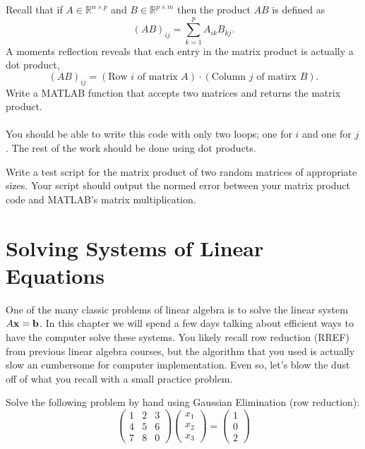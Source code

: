 \begin{problem}
    Recall that if $A \in \mathbb{R}^{n \times p}$ and $B \in \mathbb{R}^{p \times m}$
    then the product $AB$ is defined as
    \[ \left( AB \right)_{ij} = \sum_{k=1}^p A_{ik} B_{kj}. \]
    A moments reflection reveals that each entry in the matrix product is actually a dot
    product, 
    \[ \left( AB \right)_{ij} = \left( \text{Row $i$ of matrix $A$} \right) \cdot \left(
    \text{Column $j$ of matirx $B$} \right). \]
    Write a MATLAB function that accepts two matrices and returns the matrix product. \\
     \\
    You
    should be able to write this code with only two loops; one for $i$ and one for $j$.
    The rest of the work should be done using dot products.
\end{problem}
\begin{problem}
    Write a test script for the matrix product of two random matrices of appropriate sizes.  Your
    script should output the normed error between your matrix product code and MATLAB's
    matrix multiplication.
\end{problem}



\section{Solving Systems of Linear Equations}
One of the many classic problems of linear algebra is to solve the linear system $A {\bf x} =
{\bf b}$. In this chapter we will spend a few days talking about efficient ways to have the computer solve
these systems. You likely recall row reduction (RREF) from previous linear algebra
courses, but the algorithm that you used is actually slow an cumbersome for computer
implementation.  Even so, let's blow the dust off of what you recall with a small practice
problem.

\begin{problem}
    Solve the following problem by hand using Gaussian Elimination (row reduction):
    \[ \begin{pmatrix} 1 & 2 & 3 \\ 4 & 5 & 6 \\ 7 & 8 & 0 \end{pmatrix} \begin{pmatrix}
            x_1 \\ x_2 \\ x_3 \end{pmatrix} = \begin{pmatrix} 1 \\ 0 \\ 2\end{pmatrix} \]
\end{problem}


